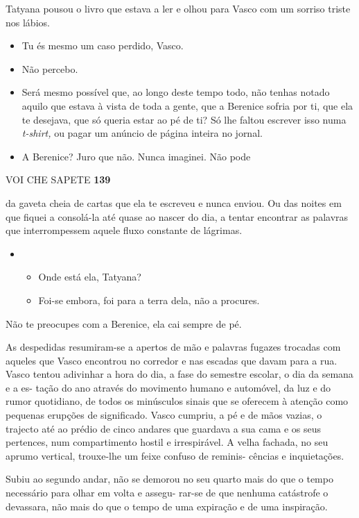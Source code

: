 Tatyana pousou o livro que estava a ler e olhou para Vasco com um
sorriso triste nos lábios.

\begin{itemize}
\tightlist
\item
  Tu és mesmo um caso perdido, Vasco.
\item
  Não percebo.
\item
  Será mesmo possível que, ao longo deste tempo todo, não tenhas notado
  aquilo que estava à vista de toda a gente, que a Berenice sofria por
  ti, que ela te desejava, que só queria estar ao pé de ti? Só lhe
  faltou escrever isso numa \emph{t-shirt, }ou pagar um anúncio de
  página inteira no jornal.
\item
  A Berenice? Juro que não. Nunca imaginei. Não pode
\end{itemize}

VOI CHE SAPETE \textbf{139}

da gaveta cheia de cartas que ela te escreveu e nunca enviou. Ou das
noites em que fiquei a consolá-la até quase ao nascer do dia, a tentar
encontrar as palavras que interrompessem aquele fluxo constante de
lágrimas.

\begin{itemize}
\item
  \begin{itemize}
  \tightlist
  \item
    Onde está ela, Tatyana?
  \item
    Foi-se embora, foi para a terra dela, não a procures.
  \end{itemize}
\end{itemize}

Não te preocupes com a Berenice, ela cai sempre de pé.

As despedidas resumiram-se a apertos de mão e palavras fugazes trocadas
com aqueles que Vasco encontrou no corredor e nas escadas que davam para
a rua. Vasco tentou adivinhar a hora do dia, a fase do semestre escolar,
o dia da semana e a es- tação do ano através do movimento humano e
automóvel, da luz e do rumor quotidiano, de todos os minúsculos sinais
que se oferecem à atenção como pequenas erupções de significado. Vasco
cumpriu, a pé e de mãos vazias, o trajecto até ao prédio de cinco
andares que guardava a sua cama e os seus pertences, num compartimento
hostil e irrespirável. A velha fachada, no seu aprumo vertical,
trouxe-lhe um feixe confuso de reminis- cências e inquietações.

Subiu ao segundo andar, não se demorou no seu quarto mais do que o tempo
necessário para olhar em volta e assegu- rar-se de que nenhuma
catástrofe o devassara, não mais do que o tempo de uma expiração e de
uma inspiração.

